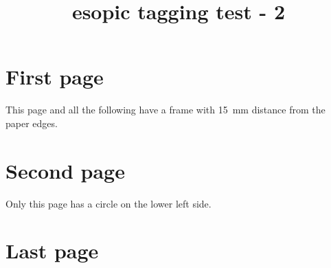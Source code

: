 \documentclass[a4paper]{article}
\title{esopic tagging test - 2}
\begin{document}
  \section*{First page}

  This page and all the following have a frame with 15~mm
  distance from the paper edges.

  \newpage

  \section*{Second page}


  Only this page has a circle on the lower left side.

  \newpage

  \section*{Last page}
\end{document}
